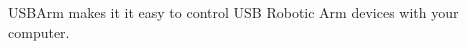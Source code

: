 \begin{introduction}

USBArm makes it it easy to control USB Robotic Arm devices with your computer.

\end{introduction}
